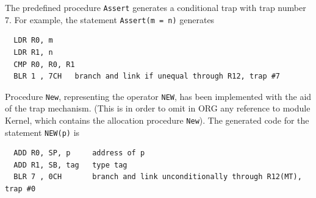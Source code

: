 The predefined procedure \verb|Assert| generates a conditional trap with trap number 7. For example,
the statement \verb|Assert(m = n)| generates
\begin{verbatim}
  LDR R0, m
  LDR R1, n
  CMP R0, R0, R1
  BLR 1 , 7CH   branch and link if unequal through R12, trap #7
\end{verbatim}

Procedure \verb|New|, representing the operator \verb|NEW|, has been implemented with the aid of the
trap mechanism. (This is in order to omit in ORG any reference to module Kernel, which contains the
allocation procedure \verb|New|). The generated code for the statement \verb|NEW(p)| is
\begin{verbatim}
  ADD R0, SP, p     address of p                                                    
  ADD R1, SB, tag   type tag
  BLR 7 , 0CH       branch and link unconditionally through R12(MT), trap #0
\end{verbatim}
